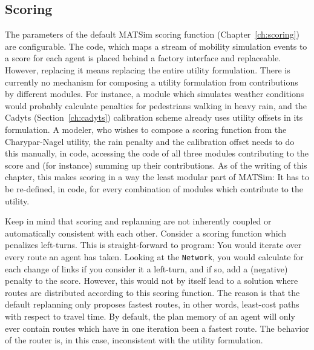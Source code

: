 \subsection{Scoring}
\label{sec:scoring-extension-point}
The parameters of the default MATSim scoring function (Chapter~\ref{ch:scoring}) are configurable. The code, which maps a stream of mobility simulation \glspl{event} to a \gls{score} for each agent is placed behind a factory interface and replaceable. However, replacing it means replacing the entire utility formulation. There is currently no mechanism for composing a utility formulation from contributions by different modules. For instance, a module which simulates weather conditions would probably calculate penalties for pedestrians walking in heavy rain, and the Cadyts (Section~\ref{ch:cadyts}) calibration scheme already uses utility offsets in its formulation. A modeler, who wishes to compose a scoring function from the Charypar-Nagel utility, the rain penalty and the calibration offset needs to do this manually, in code, accessing the code of all three modules contributing to the score and (for instance) summing up their contributions. As of the writing of this chapter, this makes scoring in a way the least modular part of MATSim: It has to be re-defined, in code, for every combination of \glspl{module} which contribute to the utility.

Keep in mind that scoring and replanning are not inherently coupled or automatically consistent with each other. Consider a scoring function which penalizes left-turns. This is straight-forward to program: You would iterate over every route an agent has taken. Looking at the \lstinline|Network|, you would calculate for each change of links if you consider it a left-turn, and if so, add a (negative) penalty to the score. However, this would not by itself lead to a solution where routes are distributed according to this scoring function. The reason is that the default replanning only proposes  fastest routes, in other words, least-cost paths with respect to travel time. By default, the plan memory of an agent will only ever contain routes which have in one iteration been a fastest route. The behavior of the router is, in this case, inconsistent with the utility formulation.
   

